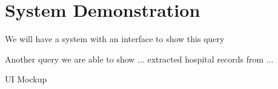 
\section{System Demonstration}

We will have a system with an interface to show this query

Another query we are able to show ... extracted hospital records from ...


UI Mockup

